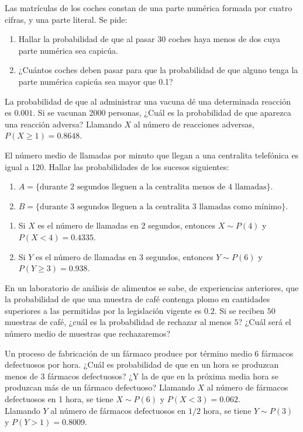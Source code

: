 {Las matrículas de los coches constan de una parte numérica formada por cuatro cifras, y una parte literal. Se pide:

\begin{enumerate}
\item  Hallar la probabilidad de que al pasar 30 coches haya menos de dos cuya parte numérica sea capicúa.
\item  ¿Cuántos coches deben pasar para que la probabilidad de que alguno tenga la parte numérica capicúa sea mayor
que 0.1?
\end{enumerate}
}
{}
{}


{La probabilidad de que al administrar una vacuna dé una determinada reacción es $0.001$. Si se vacunan 2000 personas, ¿Cuál es la probabilidad de que aparezca una reacción adversa?
}
{Llamando $X$ al número de reacciones adversas, $P(X\geq 1)=0.8648$.
}
{}


{El número medio de llamadas por minuto que llegan a una centralita telefónica es igual a 120.
Hallar las probabilidades de los sucesos siguientes: 

\begin{enumerate}
\item  $A=\{\text{durante 2 segundos lleguen a la centralita menos de 4 llamadas}\}$.
\item  $B=\{\text{durante 3 segundos lleguen a la centralita 3 llamadas como mínimo}\}$.
\end{enumerate}
}
{
\begin{enumerate}
\item Si $X$ es el número de llamadas en 2 segundos, entonces $X\sim P(4)$ y $P(X<4)=0.4335$.
\item Si $Y$ es el número de llamadas en 3 segundos, entonces $Y\sim P(6)$ y $P(Y\geq 3)=0.938$.
\end{enumerate}
}
{}


{En un laboratorio de análisis de alimentos se sabe, de experiencias anteriores, que la probabilidad de que una muestra de café contenga plomo en cantidades superiores a las permitidas por la legislación vigente es $0.2$. Si se reciben $50$ muestras de café, ¿cuál es la probabilidad de rechazar al menos $5$?
¿Cuál será el número medio de muestras que rechazaremos?
}
{}
{}


{Un proceso de fabricación de un fármaco produce por término medio 6 fármacos defectuosos por hora.
¿Cuál es probabilidad de que en un hora se produzcan menos de 3 fármacos defectuosos?
¿Y la de que en la próxima media hora se produzcan más de un fármaco defectuoso?}
{Llamando $X$ al número de fármacos defectuosos en 1 hora, se tiene $X\sim P(6)$ y $P(X<3)=0.062$.\\
Llamando $Y$ al número de fármacos defectuosos en $1/2$ hora, se tiene $Y\sim P(3)$ y $P(Y>1)=0.8009$.}
{}


